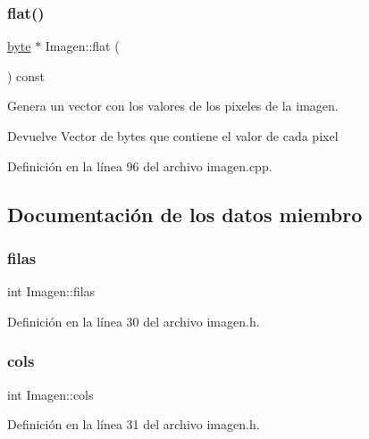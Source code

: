 \subsubsection{\texorpdfstring{flat()}{flat()}}
{\footnotesize\ttfamily \hyperlink{imagen_8h_a0c8186d9b9b7880309c27230bbb5e69d}{byte} $\ast$ Imagen\+::flat (\begin{DoxyParamCaption}{ }\end{DoxyParamCaption}) const}



Genera un vector con los valores de los pixeles de la imagen. 

\begin{DoxyReturn}{Devuelve}
Vector de bytes que contiene el valor de cada pixel 
\end{DoxyReturn}


Definición en la línea 96 del archivo imagen.\+cpp.



\subsection{Documentación de los datos miembro}
\mbox{\label{classImagen_a7f15719f14cd934dfcbd68c287bbbe8b}} 
\subsubsection{\texorpdfstring{filas}{filas}}
{\footnotesize\ttfamily int Imagen\+::filas\hspace{0.3cm}{\ttfamily [private]}}



Definición en la línea 30 del archivo imagen.\+h.

\mbox{\label{classImagen_a0a457e0727a540c60dcdf02410e25be9}} 
\subsubsection{\texorpdfstring{cols}{cols}}
{\footnotesize\ttfamily int Imagen\+::cols\hspace{0.3cm}{\ttfamily [private]}}



Definición en la línea 31 del archivo imagen.\+h.

\mbox{\label{classImagen_a2a1c6ab009c2358bbdf7134c9e7f52d6}} 
